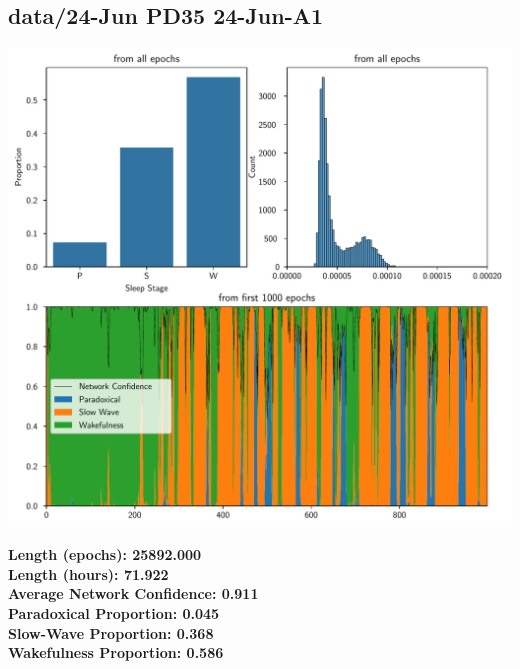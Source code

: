         \subsection*{ data/24-Jun PD35 24-Jun-A1 }
        \begin{center}
        \begin{adjustbox}{width=1\textwidth}
        \includegraphics[page=19]{figs.pdf}
        \end{adjustbox}
        \end{center}
        \large\textbf{Length (epochs): 25892.000}\\
        \textbf{Length (hours): 71.922}\\
        \textbf{Average Network Confidence: 0.911}\\
        \textbf{Paradoxical Proportion: 0.045}\\
        \textbf{Slow-Wave Proportion: 0.368}\\
        \textbf{Wakefulness Proportion: 0.586}\\
        
